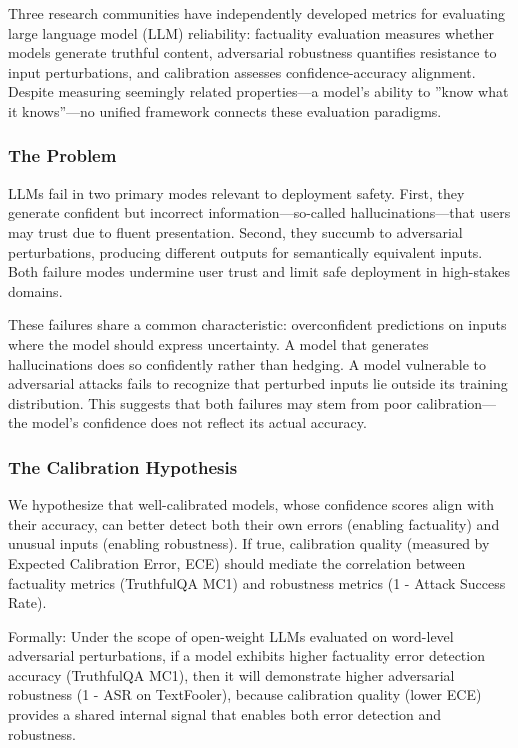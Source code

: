 
Three research communities have independently developed metrics for evaluating large language model (LLM) reliability: factuality evaluation measures whether models generate truthful content, adversarial robustness quantifies resistance to input perturbations, and calibration assesses confidence-accuracy alignment. Despite measuring seemingly related properties---a model's ability to ''know what it knows''---no unified framework connects these evaluation paradigms.

\subsubsection{The Problem}

LLMs fail in two primary modes relevant to deployment safety. First, they generate confident but incorrect information---so-called hallucinations---that users may trust due to fluent presentation. Second, they succumb to adversarial perturbations, producing different outputs for semantically equivalent inputs. Both failure modes undermine user trust and limit safe deployment in high-stakes domains.

These failures share a common characteristic: overconfident predictions on inputs where the model should express uncertainty. A model that generates hallucinations does so confidently rather than hedging. A model vulnerable to adversarial attacks fails to recognize that perturbed inputs lie outside its training distribution. This suggests that both failures may stem from poor calibration---the model's confidence does not reflect its actual accuracy.

\subsubsection{The Calibration Hypothesis}

We hypothesize that well-calibrated models, whose confidence scores align with their accuracy, can better detect both their own errors (enabling factuality) and unusual inputs (enabling robustness). If true, calibration quality (measured by Expected Calibration Error, ECE) should mediate the correlation between factuality metrics (TruthfulQA MC1) and robustness metrics (1 - Attack Success Rate).

Formally: Under the scope of open-weight LLMs evaluated on word-level adversarial perturbations, if a model exhibits higher factuality error detection accuracy (TruthfulQA MC1), then it will demonstrate higher adversarial robustness (1 - ASR on TextFooler), because calibration quality (lower ECE) provides a shared internal signal that enables both error detection and robustness.

